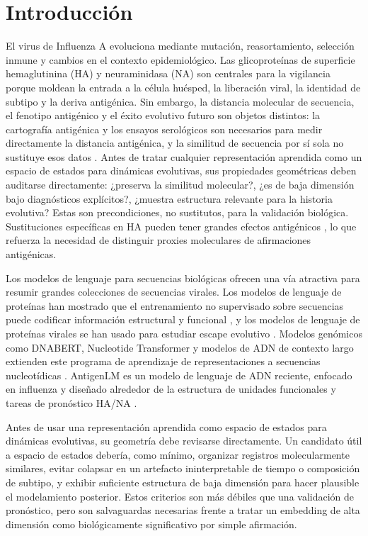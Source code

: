 \documentclass[11pt]{article}
\begin{document}
\section{Introducción}

El virus de Influenza A evoluciona mediante mutación, reasortamiento, selección inmune y cambios en el contexto epidemiológico. Las glicoproteínas de superficie hemaglutinina (HA) y neuraminidasa (NA) son centrales para la vigilancia porque moldean la entrada a la célula huésped, la liberación viral, la identidad de subtipo y la deriva antigénica. Sin embargo, la distancia molecular de secuencia, el fenotipo antigénico y el éxito evolutivo futuro son objetos distintos: la cartografía antigénica y los ensayos serológicos son necesarios para medir directamente la distancia antigénica, y la similitud de secuencia por sí sola no sustituye esos datos \cite{smith2004mapping,bedford2014integrating}. Antes de tratar cualquier representación aprendida como un espacio de estados para dinámicas evolutivas, sus propiedades geométricas deben auditarse directamente: ¿preserva la similitud molecular?, ¿es de baja dimensión bajo diagnósticos explícitos?, ¿muestra estructura relevante para la historia evolutiva? Estas son precondiciones, no sustitutos, para la validación biológica. Sustituciones específicas en HA pueden tener grandes efectos antigénicos \cite{koel2013substitutions}, lo que refuerza la necesidad de distinguir proxies moleculares de afirmaciones antigénicas.

Los modelos de lenguaje para secuencias biológicas ofrecen una vía atractiva para resumir grandes colecciones de secuencias virales. Los modelos de lenguaje de proteínas han mostrado que el entrenamiento no supervisado sobre secuencias puede codificar información estructural y funcional \cite{rives2021biological}, y los modelos de lenguaje de proteínas virales se han usado para estudiar escape evolutivo \cite{hie2021viral}. Modelos genómicos como DNABERT, Nucleotide Transformer y modelos de ADN de contexto largo extienden este programa de aprendizaje de representaciones a secuencias nucleotídicas \cite{ji2021dnabert,dallatorre2025nucleotide,nguyen2023hyenadna}. AntigenLM es un modelo de lenguaje de ADN reciente, enfocado en influenza y diseñado alrededor de la estructura de unidades funcionales y tareas de pronóstico HA/NA \cite{pei2026antigenlm}.

Antes de usar una representación aprendida como espacio de estados para dinámicas evolutivas, su geometría debe revisarse directamente. Un candidato útil a espacio de estados debería, como mínimo, organizar registros molecularmente similares, evitar colapsar en un artefacto ininterpretable de tiempo o composición de subtipo, y exhibir suficiente estructura de baja dimensión para hacer plausible el modelamiento posterior. Estos criterios son más débiles que una validación de pronóstico, pero son salvaguardas necesarias frente a tratar un embedding de alta dimensión como biológicamente significativo por simple afirmación.
\end{document}
